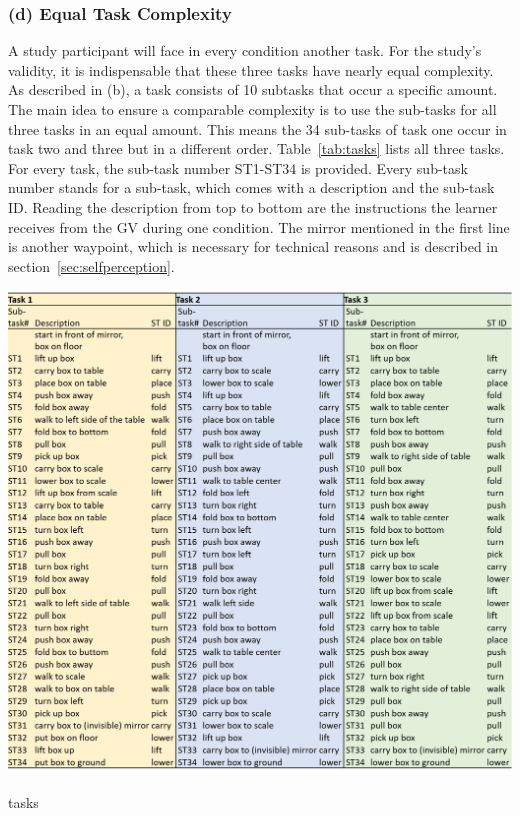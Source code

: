 \subsubsection{(d) Equal Task Complexity}
A study participant will face in every condition another task. For the study's validity, it is indispensable that these three tasks have nearly equal complexity. As described in (b), a task consists of 10 subtasks that occur a specific amount. The main idea to ensure a comparable complexity is to use the sub-tasks for all three tasks in an equal amount. This means the 34 sub-tasks of task one occur in task two and three but in a different order. Table~\ref{tab:tasks} lists all three tasks. For every task, the sub-task number ST1-ST34 is provided. Every sub-task number stands for a sub-task, which comes with a description and the sub-task ID. Reading the description from top to bottom are the instructions the learner receives from the GV during one condition. The mirror mentioned in the first line is another waypoint, which is necessary for technical reasons and is described in section~\ref{sec:selfperception}.

\begin{table}[H]
	\centering
	\includegraphics[width=\textwidth]{figures/tasks.png}
	\caption[Description of tasks]{tasks}
	\label{tab:tasks}
\end{table}

